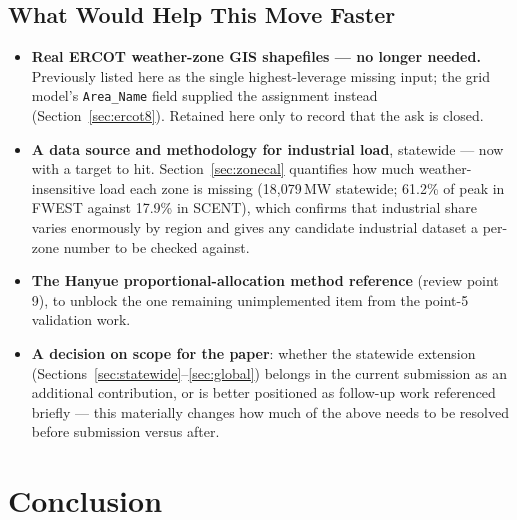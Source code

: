 \documentclass[11pt]{article}
\begin{document}
\subsection{What Would Help This Move Faster}
\label{sec:asks}

\begin{itemize}
    \item \textbf{Real ERCOT weather-zone GIS shapefiles --- no longer needed.}
    Previously listed here as the single highest-leverage missing input; the grid
    model's \texttt{Area\_Name} field supplied the assignment instead
    (Section~\ref{sec:ercot8}). Retained here only to record that the ask is closed.
    \item \textbf{A data source and methodology for industrial load}, statewide ---
    now with a target to hit. Section~\ref{sec:zonecal} quantifies how much
    weather-insensitive load each zone is missing (18{,}079\,MW statewide; 61.2\% of
    peak in FWEST against 17.9\% in SCENT), which confirms that industrial share varies
    enormously by region and gives any candidate industrial dataset a per-zone number
    to be checked against.
    \item \textbf{The Hanyue proportional-allocation method reference} (review point 9),
    to unblock the one remaining unimplemented item from the point-5 validation work.
    \item \textbf{A decision on scope for the paper}: whether the
    statewide extension (Sections~\ref{sec:statewide}--\ref{sec:global}) belongs in
    the current submission as an additional contribution, or is better positioned as
    follow-up work referenced briefly --- this materially changes how much of the above
    needs to be resolved before submission versus after.
\end{itemize}

\section{Conclusion}
\end{document}
